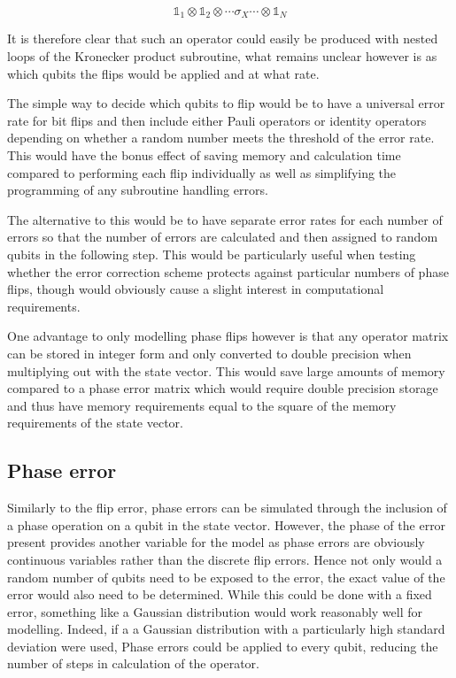 \begin{equation}
\mathbb{1}_{1} \otimes \mathbb{1}_{2} \otimes \dotsb \sigma_{X} \dotsb \otimes \mathbb{1}_{N}
\end{equation}

It is therefore clear that such an operator could easily be produced with nested loops of the Kronecker product subroutine, what remains unclear however is as which qubits the flips would be applied and at what rate. 

The simple way to decide which qubits to flip would be to have a universal error rate for bit flips and then include either Pauli operators or identity operators depending on whether a random number meets the threshold of the error rate. This would have the bonus effect of saving memory and calculation time compared to performing each flip individually as well as simplifying the programming of any subroutine handling errors.

The alternative to this would be to have separate error rates for each number of errors so that the number of errors are calculated and then assigned to random qubits in the following step. This would be particularly useful when testing whether the error correction scheme protects against particular numbers of phase flips, though would obviously cause a slight interest in computational requirements.

One advantage to only modelling phase flips however is that any operator matrix can be stored in integer form and only converted to double precision when multiplying out with the state vector. This would save large amounts of memory compared to a phase error matrix which would require double precision storage and thus have memory requirements equal to the square of the memory requirements of the state vector.


\subsection{Phase error}

Similarly to the flip error, phase errors can be simulated through the inclusion of a phase operation on a qubit in the state vector. However, the phase of the error present provides another variable for the model as phase errors are obviously continuous variables rather than the discrete flip errors. Hence not only would a random number of qubits need to be exposed to the error, the exact value of the error would also need to be determined. While this could be done with a fixed error, something like a Gaussian distribution would work reasonably well for modelling. Indeed, if a a Gaussian distribution with a particularly high standard deviation were used, Phase errors could be applied to every qubit, reducing the number of steps in calculation of the operator. 

